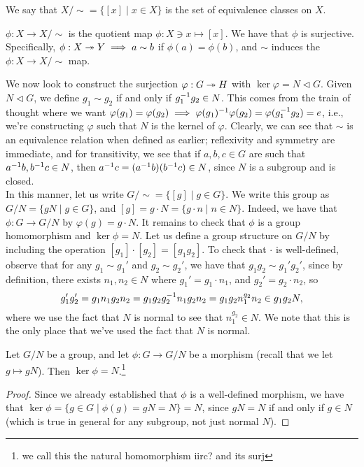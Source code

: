 \begin{definition}
    We say that $X / \sim = \{[x] \mid x \in X\}$ is the set of equivalence classes on $X$.
\end{definition}
\begin{definition}
    $\phi : X \to X / \sim$ is the quotient map $\phi : X \ni x \mapsto [x]$. We have that $\phi$ is surjective. Specifically, $\phi : X \twoheadrightarrow Y \implies a \sim b$ if $\phi(a) = \phi(b)$, and $\sim$ induces the $\phi : X \to X/\sim$ map.
\end{definition}
\noindent We now look to construct the surjection $\varphi : G \twoheadrightarrow H$ with $\ker \varphi = N \lhd G$. Given $N \lhd G$, we define $g_1 \sim g_2$ if and only if $g_1^{-1} g_2 \in N$. This comes from the train of thought where we want $\varphi(g_1) = \varphi(g_2) \implies \varphi(g_1)^{-1} \varphi(g_2) = \varphi(g_1 ^{-1} g_2) = e$, i.e., we're constructing $\varphi$ such that $N$ is the kernel of $\varphi$. Clearly, we can see that $\sim$ is an equivalence relation when defined as earlier; reflexivity and symmetry are immediate, and for transitivity, we see that if $a, b, c \in G$ are such that $a ^{-1} b, b ^{-1} c \in N$, then $a ^{-1} c = (a ^{-1} b) (b ^{-1} c) \in N$, since $N$ is a subgroup and is closed.
\\[8pt]
In this manner, let us write $G/\sim = \{[g] \mid g \in G\}$. We write this group as $G/N = \{gN \mid g \in G\}$, and $[g] = g \cdot N = \{g \cdot n \mid n \in N\}$. Indeed, we have that $\phi : G \to G/N$ by $\varphi(g) = g \cdot N$. It remains to check that $\phi$ is a group homomorphism and $\ker \phi = N$. Let us define a group structure on $G/N$ by including the operation $[g_1] \cdot [g_2] = [g_1 g_2]$. To check that $\cdot$ is well-defined, observe that for any $g_1 \sim g_1'$ and $g_2 \sim g_2'$, we have that $g_1g_2 \sim g_1'g_2'$, since by definition, there exists $n_1, n_2 \in N$ where $g_1' = g_1 \cdot n_1$, and $g_2' = g_2 \cdot n_2$, so
\[ g_1'g_2' = g_1n_1g_2n_2 = g_1g_2g_2^{-1} n_1 g_2 n_2 = g_1 g_2 n_1^{g_2} n_2 \in g_1g_2 N, \]
where we use the fact that $N$ is normal to see that $n_1^{g_2} \in N$. We note that this is the only place that we've used the fact that $N$ is normal.
\begin{theorem}
    Let $G/N$ be a group, and let $\phi : G \to G/N$ be a morphism (recall that we let $g \mapsto g N$). Then $\ker \phi = N$.\footnote{we call this the natural homomorphism iirc? and its surj}
\end{theorem}
\begin{proof}
    Since we already established that $\phi$ is a well-defined morphism, we have that $\ker \phi = \{g \in G \mid \phi(g) = gN = N\} = N$, since $gN = N$ if and only if $g \in N$ (which is true in general for any subgroup, not just normal $N$).
\end{proof}